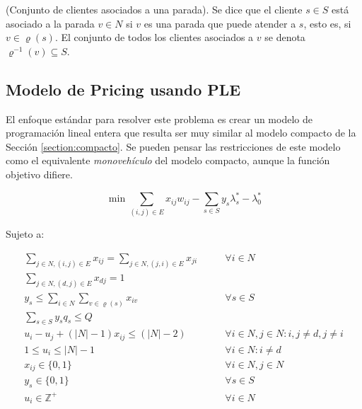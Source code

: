 \begin{definition}
    (Conjunto de clientes asociados a una parada).
    Se dice que el cliente $s \in S$ está asociado a la parada $v \in N$ si $v$ es una parada que puede atender a $s$, esto es, si $v \in \varrho(s)$. El conjunto de todos los clientes asociados a $v$ se denota $\varrho^{-1}(v) \subseteq S$.
\end{definition}

\subsection{Modelo de Pricing usando PLE}
\label{section:pricing-ple}

El enfoque estándar para resolver este problema es crear un modelo de programación lineal entera que resulta ser muy similar al modelo compacto de la Sección \ref{section:compacto}. Se pueden pensar las restricciones de este modelo como el equivalente \emph{monovehículo} del modelo compacto, aunque la función objetivo difiere. 

\begin{equation}
\min \sum_{(i, j) \in E} {x_{ij} w_{ij}} - \sum_{s \in S} {y_{s} \lambda^*_s - \lambda^*_0}
\end{equation}

Sujeto a:

\begin{align}
    \sum_{j \in N, (i, j) \in E}{x_{ij}} = \sum_{j \in N, (j, i) \in E}{x_{ji}} \qquad & \forall {i \in N} \label{eq:pricing1} \\
    \sum_{j \in N, (d, j) \in E}{x_{dj}} = 1 & \label{eq:pricing2} \\
    y_{s} \leq \sum_{i \in N}\sum_{v \in \varrho(s)}{x_{iv}} \qquad & \forall {s \in S} \label{eq:pricing3} \\
    \sum_{s \in S}{y_{s}q_s} \le Q & \label{eq:pricing4} \\
    u_{i} - u_{j} + (|N| - 1)x_{ij} \leq (|N| - 2) \qquad & \forall {i \in N, j \in N : i, j \neq d, j \neq i}  \label{eq:pricing5} \\
    1 \leq u_{i} \leq |N| - 1 \qquad & \forall {i \in N : i \neq d} \label{eq:pricing6} \\
    x_{ij} \in \{0, 1\} \qquad & \forall {i \in N, j \in N} \label{eq:pricing7} \\
y_{s} \in \{0, 1\} \qquad & \forall {s \in S} \label{eq:pricing8}\\
u_{i} \in \mathbb{Z}^{+} \qquad & \forall {i \in N} \label{eq:pricing9}
\end{align}

